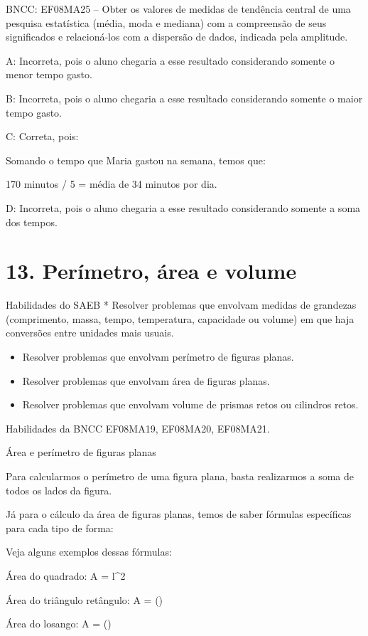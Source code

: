 {BNCC: EF08MA25 -- Obter os valores de medidas de tendência central de
uma pesquisa estatística (média, moda e mediana) com a compreensão de
seus significados e relacioná-los com a dispersão de dados, indicada
pela amplitude.

A: Incorreta, pois o aluno chegaria a esse resultado considerando
somente o menor tempo gasto.

B: Incorreta, pois o aluno chegaria a esse resultado considerando
somente o maior tempo gasto.

C: Correta, pois:

Somando o tempo que Maria gastou na semana, temos que:

170 minutos / 5 = média de 34 minutos por dia.

D: Incorreta, pois o aluno chegaria a esse resultado considerando
somente a soma dos tempos.


\section{13. Perímetro, área e
volume}

Habilidades do SAEB * Resolver problemas que envolvam medidas de
grandezas (comprimento, massa, tempo, temperatura, capacidade ou volume)
em que haja conversões entre unidades mais usuais.

\begin{itemize}
\item
  Resolver problemas que envolvam perímetro de figuras planas.
\item
  Resolver problemas que envolvam área de figuras planas.
\item
  Resolver problemas que envolvam volume de prismas retos ou cilindros
  retos.
\end{itemize}

Habilidades da BNCC EF08MA19, EF08MA20, EF08MA21.

Área e perímetro de figuras planas

Para calcularmos o perímetro de uma figura plana, basta realizarmos a
soma de todos os lados da figura.

Já para o cálculo da área de figuras planas, temos de saber fórmulas
específicas para cada tipo de forma:

Veja alguns exemplos dessas fórmulas:

Área do quadrado: A = l^2

Área do triângulo retângulo: A = ()

Área do losango: A = ()

}
